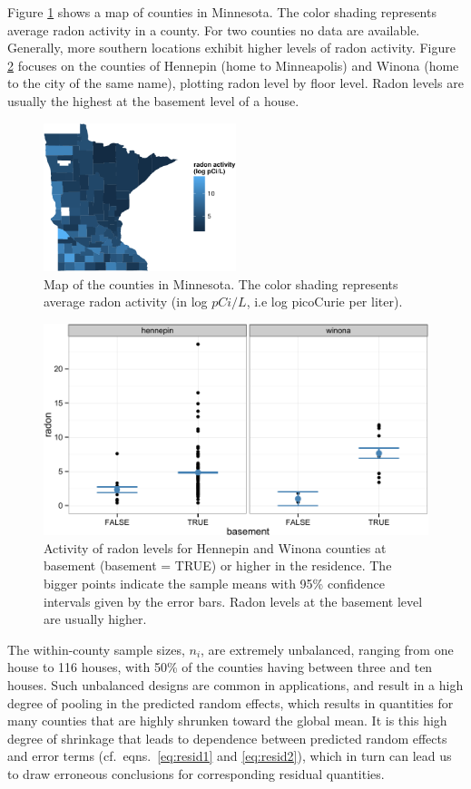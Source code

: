 \documentclass[12pt]{article} %
\begin{document}
Figure \ref{fig:map} shows a map of counties in Minnesota. The color shading represents average radon activity in a county. For two counties no data are available. Generally, more southern locations exhibit higher  levels of radon activity. Figure \ref{fig:tc} focuses on the counties of Hennepin (home to Minneapolis) and Winona (home to the city of the same name), plotting radon level by floor level. Radon levels are usually the highest at the basement level of a house. 
%
\begin{figure}[htb]
\centering
\includegraphics[width=0.5\textwidth]{figures/map.pdf}
\caption{\label{fig:map} Map of the counties in Minnesota. The color shading represents average radon activity (in log $pCi/L$, i.e log picoCurie per liter).}
\end{figure}
%
\begin{figure}[hbt]
\centering
\includegraphics[width=0.7\linewidth]{figures/radon-twocounties.pdf}
\caption{\label{fig:tc} Activity of radon levels for Hennepin and Winona counties at basement (basement = TRUE) or higher in the residence. The bigger points indicate the sample means with 95\% confidence intervals  given by the error bars. Radon levels at the basement level are usually higher.}
\end{figure}
%
The within-county sample sizes, $n_i$, are extremely unbalanced, ranging from one house to 116 houses, with 50\% of the counties having between three and ten houses. Such unbalanced designs are common in applications, and result in a high degree of pooling in the predicted random effects, which results in quantities for many counties that are highly shrunken toward the global mean. It is this high degree of shrinkage that leads to dependence between  predicted random effects and error terms (cf.~eqns.~\ref{eq:resid1} and \ref{eq:resid2}), which in turn can lead us to draw erroneous conclusions for corresponding residual quantities.
\end{document}
